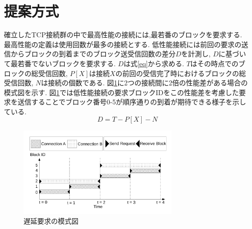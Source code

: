 \documentclass{ltjsarticle}
\begin{document}
\section{提案方式}
\vspace{-2mm}
確立したTCP接続群の中で最高性能の接続には,最若番のブロックを要求する.
最高性能の定義は使用回数が最多の接続とする.
低性能接続には前回の要求の送信からブロックの到着までのブロック送受信回数の差分\begin{math}D\end{math}を計測し,
\begin{math}D\end{math}に基づいて最若番でないブロックを要求する.
\begin{math}D\end{math}は式\ref{eq}から求める.
\begin{math}T\end{math}はその時点でのブロックの総受信回数,
\begin{math}P[X]\end{math}は接続\begin{math}X\end{math}の前回の受信完了時におけるブロックの総受信回数,
\begin{math}N\end{math}は接続の個数である.
図\ref{delay}に2つの接続間に2倍の性能差がある場合の模式図を示す.
図\ref{delay}では低性能接続の要求ブロックIDをこの性能差を考慮した要求を送信することでブロック番号0-5が順序通りの到着が期待できる様子を示している.
\vspace{-4mm}
\begin{equation}
	\label{eq}
	D = T - P[X] - N
\end{equation}
\vspace{-11mm}
\begin{figure}[h]
	\centering
	\includegraphics[width=8cm]{figure/delay.pdf}
	\vspace{-6mm}
	\caption{遅延要求の模式図}
	\label{delay}
\end{figure}
\vspace{-12mm}
\end{document}
